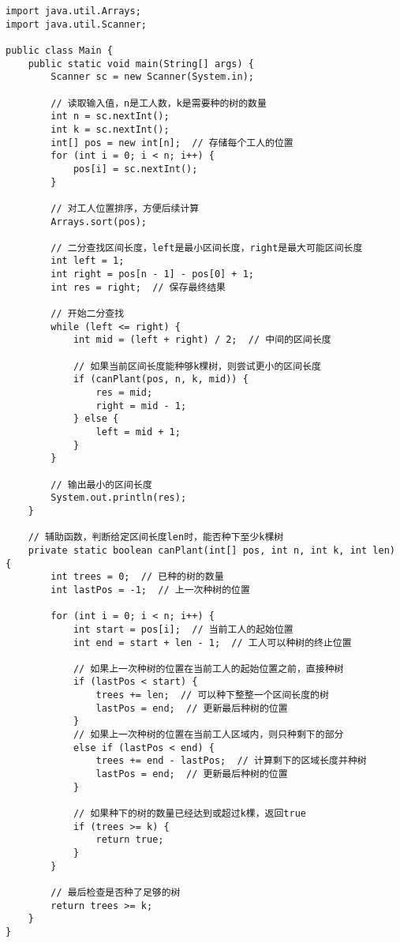 \documentclass[a4paper]{ctexart}
\begin{document}
\begin{lstlisting}
import java.util.Arrays;
import java.util.Scanner;

public class Main {
	public static void main(String[] args) {
		Scanner sc = new Scanner(System.in);
		
		// 读取输入值，n是工人数，k是需要种的树的数量
		int n = sc.nextInt();
		int k = sc.nextInt();
		int[] pos = new int[n];  // 存储每个工人的位置
		for (int i = 0; i < n; i++) {
			pos[i] = sc.nextInt();
		}
		
		// 对工人位置排序，方便后续计算
		Arrays.sort(pos);
		
		// 二分查找区间长度，left是最小区间长度，right是最大可能区间长度
		int left = 1;
		int right = pos[n - 1] - pos[0] + 1;
		int res = right;  // 保存最终结果
		
		// 开始二分查找
		while (left <= right) {
			int mid = (left + right) / 2;  // 中间的区间长度
			
			// 如果当前区间长度能种够k棵树，则尝试更小的区间长度
			if (canPlant(pos, n, k, mid)) {
				res = mid;
				right = mid - 1;
			} else {
				left = mid + 1;
			}
		}
		
		// 输出最小的区间长度
		System.out.println(res);
	}
	
	// 辅助函数，判断给定区间长度len时，能否种下至少k棵树
	private static boolean canPlant(int[] pos, int n, int k, int len) {
		int trees = 0;  // 已种的树的数量
		int lastPos = -1;  // 上一次种树的位置
		
		for (int i = 0; i < n; i++) {
			int start = pos[i];  // 当前工人的起始位置
			int end = start + len - 1;  // 工人可以种树的终止位置
			
			// 如果上一次种树的位置在当前工人的起始位置之前，直接种树
			if (lastPos < start) {
				trees += len;  // 可以种下整整一个区间长度的树
				lastPos = end;  // 更新最后种树的位置
			}
			// 如果上一次种树的位置在当前工人区域内，则只种剩下的部分
			else if (lastPos < end) {
				trees += end - lastPos;  // 计算剩下的区域长度并种树
				lastPos = end;  // 更新最后种树的位置
			}
			
			// 如果种下的树的数量已经达到或超过k棵，返回true
			if (trees >= k) {
				return true;
			}
		}
		
		// 最后检查是否种了足够的树
		return trees >= k;
	}
}

\end{lstlisting}
	
	
\end{document}
